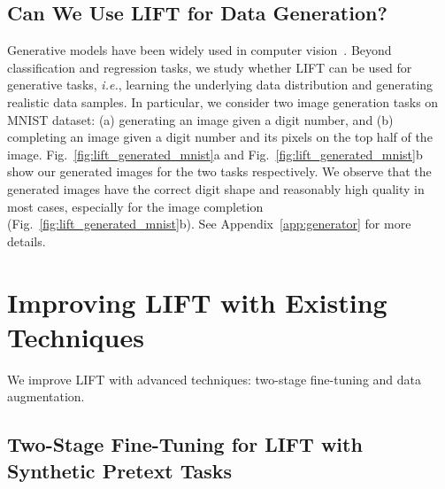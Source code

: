 \subsection{Can We Use \textsc{LIFT} for Data Generation?}\label{sec:generator}

Generative models have been widely used in computer vision~\citep{goodfellow2020generative,kingma2019introduction,croitoru2022diffusion}. Beyond classification and regression tasks, we study whether \textsc{LIFT} can be used for generative tasks, \textit{i.e.}, learning the underlying data distribution and generating realistic data samples. In particular, we consider two image generation tasks on MNIST dataset: (a) generating an image given a digit number, and (b) completing an image given a digit number and its pixels on the top half of the image.
Fig.~\ref{fig:lift_generated_mnist}a and Fig.~\ref{fig:lift_generated_mnist}b show our generated images for the two tasks respectively. We observe that the generated images have the correct digit shape and reasonably high quality in most cases, especially for the image completion (Fig.~\ref{fig:lift_generated_mnist}b).
See Appendix~\ref{app:generator} for more details.

\section{Improving \textsc{LIFT} with Existing Techniques}
\label{sec:lift_improve}

We improve \textsc{LIFT} with advanced techniques: two-stage fine-tuning and data augmentation.

\subsection{Two-Stage Fine-Tuning for \textsc{LIFT} with Synthetic Pretext Tasks}

\label{sec:improve_two_stage}

